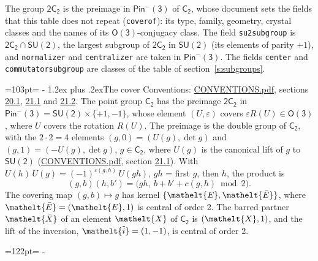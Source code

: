 \documentclass[10pt,a4paper]{article}
\makeatletter
\renewcommand\section{\@startsection{section}{1}{\z@}{-3ex plus -1ex minus -.2ex}%
  {1.2ex plus .2ex}{\normalfont\large\sffamily\bfseries\color{parttitle}}}
\newcommand{\needspace}[1]{\par\penalty-100\begingroup\dimen0=#1\relax\dimen2=\pagegoal
  \advance\dimen2-\pagetotal\ifdim\dimen0>\dimen2\relax\ifdim\dimen2>0pt\vfil\break\fi\fi
  \endgroup}
\numberwithin{equation}{section}
\newcommand{\eltfont}[1]{{\let\sigma\eltsigma\mathelt{#1}}}
\newcommand{\grp}[1]{\mathsf{#1}}
\newcommand{\elt}[1]{\eltfont{#1}}
\newcommand{\dirprod}{\times}
\newcommand{\barred}[1]{\bar{#1}}
\newcommand{\lift}[1]{\tilde{#1}}
\makeatother
\begin{document}
\leavevmode\label{n:element.inversion}\label{n:group.preimage}The group $\grp{2C_{2}}$ is the preimage in $\grp{Pin^{-}(3)}$ of \href{../../../rotation/data/pdf/C2.pdf}{$\grp{C_{2}}$}, whose document sets the fields that this table does not repeat (\texttt{coverof}): its type, family, geometry, crystal classes and the names of its \href{../../../rotation/data/pdf/O3.pdf}{$\grp{O(3)}$}-conjugacy class. The field \texttt{su2subgroup} is $\grp{2C_{2}} \cap \grp{SU(2)}$, the largest subgroup of $\grp{2C_{2}}$ in $\grp{SU(2)}$ (its elements of parity $+1$), and \texttt{normalizer} and \texttt{centralizer} are taken in $\grp{Pin^{-}(3)}$. The fields \texttt{center} and \texttt{commutatorsubgroup} are classes of the table of section~\ref{s:subgroups}.
\needspace{103pt}
\section{The cover}\label{s:cover}
Conventions: \href{../../CONVENTIONS.pdf}{CONVENTIONS.pdf}, sections \href{../../CONVENTIONS.pdf\#conv.20.1}{20.1}, \href{../../CONVENTIONS.pdf\#conv.21.1}{21.1} and \href{../../CONVENTIONS.pdf\#conv.21.2}{21.2}.
\leavevmode\label{n:group.pin.minus}\label{n:group.su2}\label{n:local.pin.sign}\label{n:matrix.covered}\label{n:matrix.lift.su2}\label{n:index.bar}The point group $\grp{C_{2}}$ has the preimage $\grp{2C_{2}}$ in $\grp{Pin^{-}(3)} = \grp{SU(2)} \dirprod \{+1, -1\}$, whose element $(U, \varepsilon)$ covers $\varepsilon R(U) \in \grp{O(3)}$, where $U$ covers the rotation $R(U)$. The preimage is the double group of $\grp{C_{2}}$, with the $2 \cdot 2 = 4$ elements $(g, 0) = (U(g), \det g)$ and $(g, 1) = (-U(g), \det g)$, $g \in \grp{C_{2}}$, where $U(g)$ is the canonical lift of $g$ to $\grp{SU(2)}$ (\href{../../CONVENTIONS.pdf}{CONVENTIONS.pdf}, section \href{../../CONVENTIONS.pdf\#conv.21.1}{21.1}). \label{n:function.cocycle}With $U(h)\,U(g) = (-1)^{c(g,h)}\,U(gh)$, $gh$ = first $g$, then $h$, the product is
\begin{equation}\label{e:product}(g, b)(h, b') = \bigl(gh,\ b + b' + c(g, h) \bmod 2\bigr).\end{equation}
\leavevmode\label{n:mark.bar}The covering map $(g, b) \mapsto g$ has kernel $\{\elt{E}, \elt{\barred{E}}\}$, where $\elt{\barred{E}} = (\elt{E}, 1)$ is central of order 2. \label{n:element.named}\label{n:mark.lift}The barred partner $\elt{\barred{X}}$ of an element $\elt{X}$ of $\grp{C_{2}}$ is $(\elt{X}, 1)$, and the lift of the inversion, $\elt{\lift{i}} = (1, -1)$, is central of order 2.
\needspace{122pt}
\end{document}
